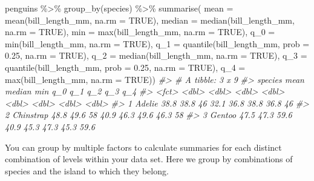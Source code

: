 \documentclass[
  12pt,
]{book}
\newenvironment{Shaded}{\begin{snugshade}}{\end{snugshade}}
\newcommand{\AttributeTok}[1]{\textcolor[rgb]{0.77,0.63,0.00}{#1}}
\newcommand{\CommentTok}[1]{\textcolor[rgb]{0.56,0.35,0.01}{\textit{#1}}}
\newcommand{\ConstantTok}[1]{\textcolor[rgb]{0.00,0.00,0.00}{#1}}
\newcommand{\FloatTok}[1]{\textcolor[rgb]{0.00,0.00,0.81}{#1}}
\newcommand{\FunctionTok}[1]{\textcolor[rgb]{0.00,0.00,0.00}{#1}}
\newcommand{\NormalTok}[1]{#1}
\newcommand{\SpecialCharTok}[1]{\textcolor[rgb]{0.00,0.00,0.00}{#1}}
\begin{document}
\begin{Shaded}
\begin{Highlighting}[]
\NormalTok{penguins }\SpecialCharTok{\%\textgreater{}\%} 
  \FunctionTok{group\_by}\NormalTok{(species) }\SpecialCharTok{\%\textgreater{}\%}
  \FunctionTok{summarise}\NormalTok{(}
    \AttributeTok{mean =} \FunctionTok{mean}\NormalTok{(bill\_length\_mm, }\AttributeTok{na.rm =} \ConstantTok{TRUE}\NormalTok{),}
    \AttributeTok{median =} \FunctionTok{median}\NormalTok{(bill\_length\_mm, }\AttributeTok{na.rm =} \ConstantTok{TRUE}\NormalTok{),}
    \AttributeTok{min =} \FunctionTok{max}\NormalTok{(bill\_length\_mm, }\AttributeTok{na.rm =} \ConstantTok{TRUE}\NormalTok{),}
    \AttributeTok{q\_0 =} \FunctionTok{min}\NormalTok{(bill\_length\_mm, }\AttributeTok{na.rm =} \ConstantTok{TRUE}\NormalTok{),}
    \AttributeTok{q\_1 =} \FunctionTok{quantile}\NormalTok{(bill\_length\_mm, }\AttributeTok{prob =} \FloatTok{0.25}\NormalTok{, }\AttributeTok{na.rm =} \ConstantTok{TRUE}\NormalTok{),}
    \AttributeTok{q\_2 =} \FunctionTok{median}\NormalTok{(bill\_length\_mm, }\AttributeTok{na.rm =} \ConstantTok{TRUE}\NormalTok{),}
    \AttributeTok{q\_3 =} \FunctionTok{quantile}\NormalTok{(bill\_length\_mm, }\AttributeTok{prob =} \FloatTok{0.25}\NormalTok{, }\AttributeTok{na.rm =} \ConstantTok{TRUE}\NormalTok{),}
    \AttributeTok{q\_4 =} \FunctionTok{max}\NormalTok{(bill\_length\_mm, }\AttributeTok{na.rm =} \ConstantTok{TRUE}\NormalTok{))}
\CommentTok{\#\textgreater{} \# A tibble: 3 x 9}
\CommentTok{\#\textgreater{}   species    mean median   min   q\_0   q\_1   q\_2   q\_3   q\_4}
\CommentTok{\#\textgreater{}   \textless{}fct\textgreater{}     \textless{}dbl\textgreater{}  \textless{}dbl\textgreater{} \textless{}dbl\textgreater{} \textless{}dbl\textgreater{} \textless{}dbl\textgreater{} \textless{}dbl\textgreater{} \textless{}dbl\textgreater{} \textless{}dbl\textgreater{}}
\CommentTok{\#\textgreater{} 1 Adelie     38.8   38.8  46    32.1  36.8  38.8  36.8  46  }
\CommentTok{\#\textgreater{} 2 Chinstrap  48.8   49.6  58    40.9  46.3  49.6  46.3  58  }
\CommentTok{\#\textgreater{} 3 Gentoo     47.5   47.3  59.6  40.9  45.3  47.3  45.3  59.6}
\end{Highlighting}
\end{Shaded}

You can group by multiple factors to calculate summaries for each distinct combination of levels within your data set. Here we group by combinations of species and the island to which they belong.
\end{document}
